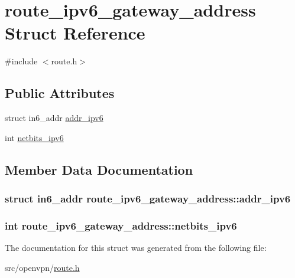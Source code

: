 \hypertarget{structroute__ipv6__gateway__address}{}\section{route\+\_\+ipv6\+\_\+gateway\+\_\+address Struct Reference}
\label{structroute__ipv6__gateway__address}


{\ttfamily \#include $<$route.\+h$>$}

\subsection*{Public Attributes}
\begin{DoxyCompactItemize}
\item 
struct in6\+\_\+addr \hyperlink{structroute__ipv6__gateway__address_a39fc33a43d5d638af4fcc6c71afd5600}{addr\+\_\+ipv6}
\item 
int \hyperlink{structroute__ipv6__gateway__address_aaa545c3b41d873b8496352cc617ee33e}{netbits\+\_\+ipv6}
\end{DoxyCompactItemize}


\subsection{Member Data Documentation}
\hypertarget{structroute__ipv6__gateway__address_a39fc33a43d5d638af4fcc6c71afd5600}{}
\subsubsection[{addr\+\_\+ipv6}]{\setlength{\rightskip}{0pt plus 5cm}struct in6\+\_\+addr route\+\_\+ipv6\+\_\+gateway\+\_\+address\+::addr\+\_\+ipv6}\label{structroute__ipv6__gateway__address_a39fc33a43d5d638af4fcc6c71afd5600}
\hypertarget{structroute__ipv6__gateway__address_aaa545c3b41d873b8496352cc617ee33e}{}
\subsubsection[{netbits\+\_\+ipv6}]{\setlength{\rightskip}{0pt plus 5cm}int route\+\_\+ipv6\+\_\+gateway\+\_\+address\+::netbits\+\_\+ipv6}\label{structroute__ipv6__gateway__address_aaa545c3b41d873b8496352cc617ee33e}


The documentation for this struct was generated from the following file\+:\begin{DoxyCompactItemize}
\item 
src/openvpn/\hyperlink{route_8h}{route.\+h}\end{DoxyCompactItemize}

